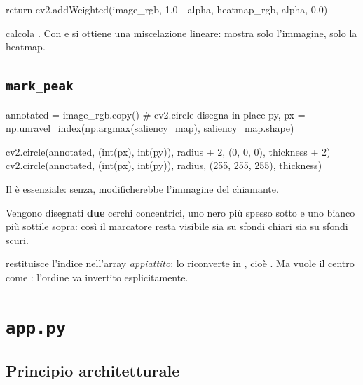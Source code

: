 \begin{idebox}
\begin{pycode}
return cv2.addWeighted(image_rgb, 1.0 - alpha, heatmap_rgb, alpha, 0.0)
\end{pycode}
\end{idebox}

 calcola . Con
 e  si ottiene una miscelazione lineare:  mostra
solo l'immagine,  solo la heatmap.

\subsection{\texttt{mark\_peak}}

\begin{idebox}
\begin{pycode}
annotated = image_rgb.copy()   # cv2.circle disegna in-place
py, px = np.unravel_index(np.argmax(saliency_map), saliency_map.shape)

cv2.circle(annotated, (int(px), int(py)), radius + 2, (0, 0, 0), thickness + 2)
cv2.circle(annotated, (int(px), int(py)), radius, (255, 255, 255), thickness)
\end{pycode}
\end{idebox}

Il  è essenziale: senza,  modificherebbe l'immagine del chiamante.

Vengono disegnati \textbf{due} cerchi concentrici, uno nero più spesso sotto e uno bianco più
sottile sopra: così il marcatore resta visibile sia su sfondi chiari sia su sfondi scuri.

\begin{attenzione}
 restituisce l'indice nell'array \emph{appiattito};
 lo riconverte in , cioè . Ma
 vuole il centro come : l'ordine va invertito esplicitamente.
\end{attenzione}

\section{\texttt{app.py}}

\subsection{Principio architetturale}

